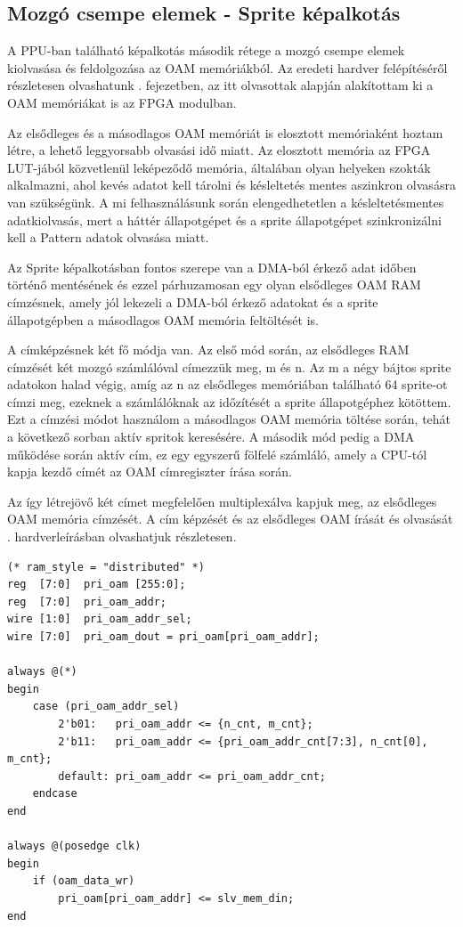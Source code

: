 	\subsection{Mozgó csempe elemek - Sprite képalkotás}
	\label{sec:fpga-sprite-rendering}

	A PPU-ban található képalkotás második rétege a mozgó csempe elemek kiolvasása és feldolgozása az OAM memóriákból. Az eredeti hardver felépítéséről részletesen olvashatunk . fejezetben, az itt olvasottak alapján alakítottam ki a OAM memóriákat is az FPGA modulban. 
	
	Az elsődleges és a másodlagos OAM memóriát is elosztott memóriaként hoztam létre, a lehető leggyorsabb olvasási idő miatt. Az elosztott memória az FPGA LUT-jából közvetlenül leképeződő memória, általában olyan helyeken szokták alkalmazni, ahol kevés adatot kell tárolni és késleltetés mentes aszinkron olvasásra van szükségünk. A mi felhasználásunk során elengedhetetlen a késleltetésmentes adatkiolvasás, mert a háttér állapotgépet és a sprite állapotgépet szinkronizálni kell a Pattern adatok olvasása miatt.
	
	Az Sprite képalkotásban fontos szerepe van a DMA-ból érkező adat időben történő mentésének és ezzel párhuzamosan egy olyan elsődleges OAM RAM címzésnek, amely jól lekezeli a DMA-ból érkező adatokat és a sprite állapotgépben a másodlagos OAM memória feltöltését is. 
	
	A címképzésnek két fő módja van. Az első mód során, az elsődleges RAM címzését két mozgó számlálóval címezzük meg, m és n. Az m a négy bájtos sprite adatokon halad végig, amíg az n az elsődleges memóriában található 64 sprite-ot címzi meg, ezeknek a számlálóknak az időzítését a sprite állapotgéphez kötöttem. Ezt a címzési módot használom a másodlagos OAM memória töltése során, tehát a következő sorban aktív spritok keresésére. A második mód pedig a DMA működése során aktív cím, ez egy egyszerű fölfelé számláló, amely a CPU-tól kapja kezdő címét az OAM címregiszter írása során.
	
	Az így létrejövő két címet megfelelően multiplexálva kapjuk meg, az elsődleges OAM memória címzését. A cím képzését és az elsődleges OAM írását és olvasását . hardverleírásban olvashatjuk részletesen.

\begin{lstlisting}[caption={Az elsődleges OAM RAM írása és olvasása}, label={code:Primary-oam}, style=prettyverilog]
(* ram_style = "distributed" *)
reg  [7:0]  pri_oam [255:0];
reg  [7:0]  pri_oam_addr;
wire [1:0]  pri_oam_addr_sel;
wire [7:0]  pri_oam_dout = pri_oam[pri_oam_addr];

always @(*) 
begin
	case (pri_oam_addr_sel)
		2'b01:   pri_oam_addr <= {n_cnt, m_cnt};
		2'b11:   pri_oam_addr <= {pri_oam_addr_cnt[7:3], n_cnt[0], m_cnt}; 
		default: pri_oam_addr <= pri_oam_addr_cnt; 
	endcase    
end

always @(posedge clk) 
begin
	if (oam_data_wr)
		pri_oam[pri_oam_addr] <= slv_mem_din;    
end\end{lstlisting} 

